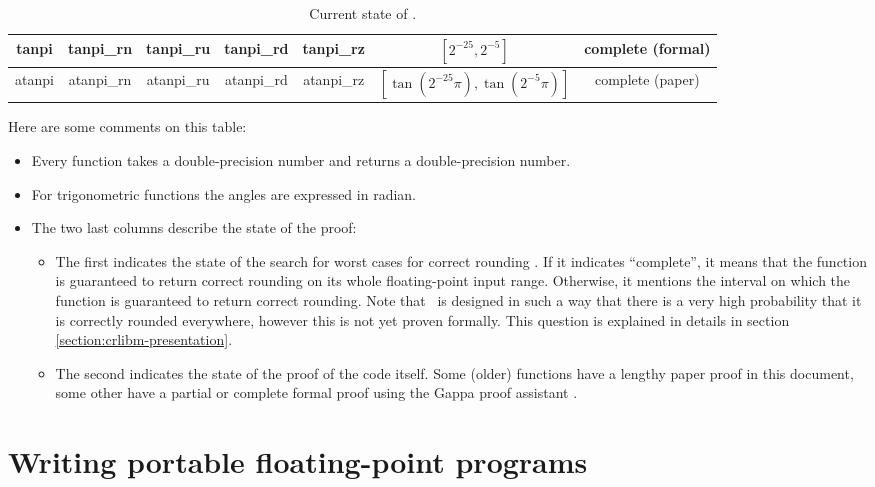 \begin{table}[t]
\begin{center}
\begin{tabular}{|c|c|c|c|c||c|c|}
    tanpi & tanpi\_rn & tanpi\_ru & tanpi\_rd & tanpi\_rz & $[2^{-25},2^{-5}]$& complete (formal)\\ \hline
    atanpi & atanpi\_rn & atanpi\_ru & atanpi\_rd & atanpi\_rz & $[\tan(2^{-25}\pi),\tan(2^{-5}\pi)]$ & complete (paper)\\ \hline
\end{tabular}
\end{center}
  
\caption{Current state of \crlibm.}
\label{tab:currentstate}
\end{table}

Here are some comments on this table:
\begin{itemize}
\item Every function takes a double-precision number and returns a
  double-precision number.
\item For trigonometric functions the angles are
  expressed in radian.
\item The two last columns describe the state of the
  proof:
  \begin{itemize}
  \item The first indicates the state of the search for worst cases
    for correct rounding \cite{LMT98,Lef2000}. If it indicates
    ``complete'', it means that the function is guaranteed to return
    correct rounding on its whole floating-point input range.
    Otherwise, it mentions the interval on which the function is
    guaranteed to return correct rounding. Note that \crlibm\ is
    designed in such a way that there is a very high probability that it
    is correctly rounded everywhere, however this is not yet proven
    formally. This question is explained in details in section
    \ref{section:crlibm-presentation}.

  \item The second indicates the state of the proof of the code
    itself. Some (older) functions have a lengthy paper proof in this
    document, some other have a partial or complete formal proof using
    the Gappa proof assistant \cite{Melqu05,DinLauMel2005}.
  \end{itemize}
\end{itemize}


\section{Writing portable floating-point programs}

